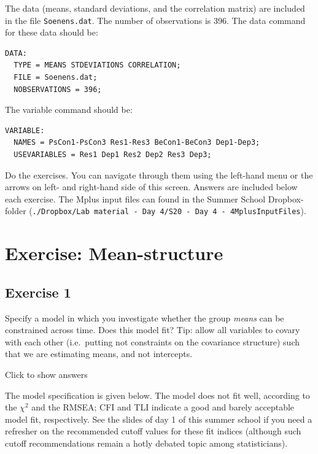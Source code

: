 \documentclass[
]{book}
\begin{document}
The data (means, standard deviations, and the correlation matrix) are included in the file \texttt{Soenens.dat}. The number of observations is 396. The data command for these data should be:

\begin{verbatim}
DATA:       
  TYPE = MEANS STDEVIATIONS CORRELATION;   
  FILE = Soenens.dat;
  NOBSERVATIONS = 396;
\end{verbatim}

The variable command should be:

\begin{verbatim}
VARIABLE:   
  NAMES = PsCon1-PsCon3 Res1-Res3 BeCon1-BeCon3 Dep1-Dep3;
  USEVARIABLES = Res1 Dep1 Res2 Dep2 Res3 Dep3;
\end{verbatim}

Do the exercises. You can navigate through them using the left-hand menu or the arrows on left- and right-hand side of this screen. Answers are included below each exercise. The Mplus input files can found in the Summer School Dropbox-folder (\texttt{./Dropbox/Lab\ material\ -\ Day\ 4/S20\ -\ Day\ 4\ -\ 4MplusInputFiles}).

\hypertarget{exercise-mean-structure}{%
\section{Exercise: Mean-structure}\label{exercise-mean-structure}}

\hypertarget{exercise-1}{%
\subsection{Exercise 1}\label{exercise-1}}

Specify a model in which you investigate whether the group \emph{means} can be constrained across time. Does this model fit? Tip: allow all variables to covary with each other (i.e.~putting not constraints on the covariance structure) such that we are estimating means, and not intercepts.

Click to show answers

The model specification is given below. The model does not fit well, according to the \(\chi^{2}\) and the RMSEA; CFI and TLI indicate a good and barely acceptable model fit, respectively. See the slides of day 1 of this summer school if you need a refresher on the recommended cutoff values for these fit indices (although such cutoff recommendations remain a hotly debated topic among statisticians).
\end{document}
